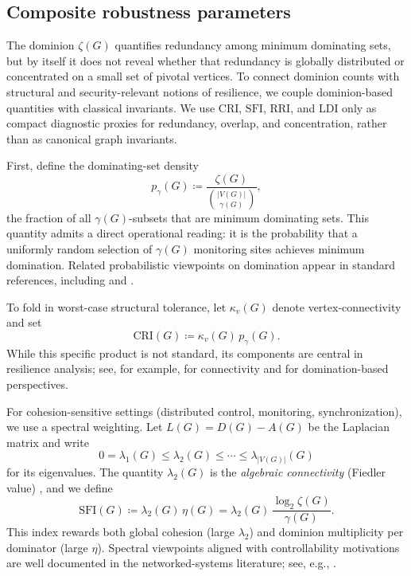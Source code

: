 \documentclass[11pt]{article}
\theoremstyle{plain}
\theoremstyle{definition}
\theoremstyle{remark}
\begin{document}
\subsection{Composite robustness parameters}\label{subsec:composite-robustness}

The dominion $\zeta(G)$ quantifies redundancy among minimum dominating sets, but by itself it
does not reveal whether that redundancy is globally distributed or concentrated on a small set
of pivotal vertices.  To connect dominion counts with structural and security-relevant notions
of resilience, we couple dominion-based quantities with classical invariants. We use $\mathrm{CRI}$, $\mathrm{SFI}$, $\mathrm{RRI}$, and $\mathrm{LDI}$ only as compact diagnostic proxies for redundancy, overlap, and concentration, rather than as canonical graph invariants.


First, define the dominating-set density
\[
p_\gamma(G)\coloneqq \frac{\zeta(G)}{\binom{|V(G)|}{\gamma(G)}},
\]
the fraction of all $\gamma(G)$-subsets that are minimum dominating sets.  This quantity admits
a direct operational reading: it is the probability that a uniformly random selection of
$\gamma(G)$ monitoring sites achieves minimum domination.  Related probabilistic viewpoints on
domination appear in standard references, including \cite{haynes-hedetniemi-slater-1998-fundamentals} and
\cite{BonatoNowakowski2011}.

To fold in worst-case structural tolerance, let $\kappa_v(G)$ denote vertex-connectivity and set
\[
\mathrm{CRI}(G)\coloneqq \kappa_v(G)\,p_\gamma(G).
\]
While this specific product is not standard, its components are central in resilience analysis;
see, for example, \cite{Menger1927,West2001} for connectivity and \cite{goddard-henning-2013} for
domination-based perspectives.

For cohesion-sensitive settings (distributed control, monitoring, synchronization), we use a
spectral weighting.  Let $L(G)=D(G)-A(G)$ be the Laplacian matrix and write
\[
0=\lambda_1(G)\le \lambda_2(G)\le \cdots \le \lambda_{|V(G)|}(G)
\]
for its eigenvalues.  The quantity $\lambda_2(G)$ is the \emph{algebraic connectivity}
(Fiedler value) \cite{Fiedler1973,Chung1997}, and we define
\[
\mathrm{SFI}(G)\coloneqq \lambda_2(G)\,\eta(G)
=\lambda_2(G)\,\frac{\log_2 \zeta(G)}{\gamma(G)}.
\]
This index rewards both global cohesion (large $\lambda_2$) and dominion multiplicity per
dominator (large $\eta$).  Spectral viewpoints aligned with controllability motivations are
well documented in the networked-systems literature; see, e.g., \cite{PequitoKarSchutter2017}.
\end{document}
